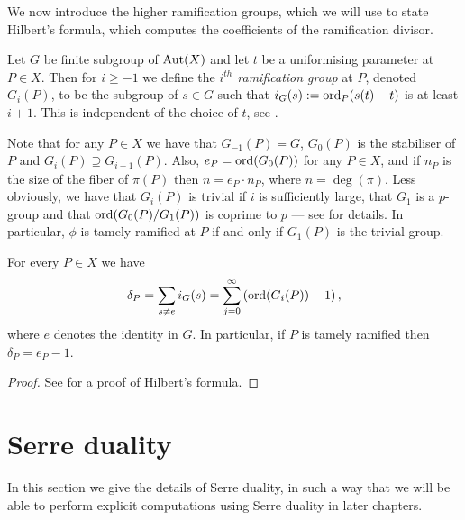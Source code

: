 \begin{cor}
We now introduce the higher ramification groups, which we will use to state Hilbert's formula, which computes the coefficients of the ramification divisor.

   \begin{defn}
    Let $G$ be finite subgroup of $\operatorname{Aut}(X)$ and let $t$ be a uniformising parameter at $P\in X$.
    Then for $i\geq -1$ we define the \emph{$i^{th}$ ramification group} at $P$, denoted $G_i(P)$, to be the subgroup of $s\in G$ such that $i_G(s) := \operatorname{ord}_P(s(t)-t)$ is at least $i+1$.
    This is	independent of the choice of $t$, see \cite[Chap. IV, \S 1, pg. 62]{localfields}.
    \end{defn}

Note that for any $P\in X$ we have that $G_{-1}(P)=G$, $G_0(P)$ is the stabiliser of $P$ and $G_i(P)\supseteq G_{i+1}(P)$.
Also, $e_P = \operatorname{ord} (G_0(P))$ for any $P \in X$, and if $n_P$ is the size of the fiber of $\pi(P)$ then $n = e_P\cdot n_P$, where $n = \deg(\pi)$.
Less obviously, we have that $G_i(P)$ is trivial if $i$ is sufficiently large, that $G_1$ is a $p$-group and that $\operatorname{ord}(G_0(P)/G_1(P))$ is coprime to $p$ ---  see \cite[Chap. IV, \S 1]{localfields} for details.
In particular, $\phi$ is tamely ramified at $P$ if and only if $G_1(P)$ is the trivial group.



    \begin{thm}\label{hilbertsformula}
    For every $P\in X$ we have
        \begin{equation*}
        \delta_P = \sum_{s\neq e}i_G(s)=\sum_{j=0}^{\infty}\left(\operatorname{ord}(G_i(P))-1\right),\label{ramdiv}
        \end{equation*}
    where $e$ denotes the identity in $G$.
    In particular, if $P$ is tamely ramified then $\delta_P = e_P -1$.
    \end{thm}
    \begin{proof}
    See \cite[Chap. IV, \S 1, Prop. 4]{localfields} for a proof of Hilbert's formula.
    \end{proof}

 
\section{Serre duality}

In this section we give the details of Serre duality, in such a way that we will be able to perform explicit computations using Serre duality in later chapters.



\end{cor}

